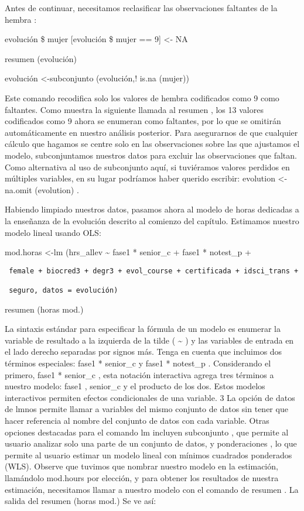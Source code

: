 \documentclass[
]{book}
\begin{document}
Antes de continuar, necesitamos reclasificar las observaciones faltantes de la hembra :

evolución \$ mujer {[}evolución \$ mujer == 9{]} \textless- NA

resumen (evolución)

evolución \textless-subconjunto (evolución,! is.na (mujer))

Este comando recodifica solo los valores de hembra codificados como 9 como faltantes. Como muestra la siguiente llamada al resumen , los 13 valores codificados como 9 ahora se enumeran como faltantes, por lo que se omitirán automáticamente en nuestro análisis posterior. Para asegurarnos de que cualquier cálculo que hagamos se centre solo en las observaciones sobre las que ajustamos el modelo, subconjuntamos nuestros datos para excluir las observaciones que faltan. Como alternativa al uso de subconjunto aquí, si tuviéramos valores perdidos en múltiples variables, en su lugar podríamos haber querido escribir: evolution \textless-na.omit (evolution) .

Habiendo limpiado nuestros datos, pasamos ahora al modelo de horas dedicadas a la enseñanza de la evolución descrito al comienzo del capítulo. Estimamos nuestro modelo lineal usando OLS:

mod.horas \textless-lm (hrs\_allev \textasciitilde{} fase1 * senior\_c + fase1 * notest\_p +

\begin{verbatim}
 female + biocred3 + degr3 + evol_course + certificada + idsci_trans +

 seguro, datos = evolución)
\end{verbatim}

resumen (horas mod.)

La sintaxis estándar para especificar la fórmula de un modelo es enumerar la variable de resultado a la izquierda de la tilde ( \textasciitilde{} ) y las variables de entrada en el lado derecho separadas por signos más. Tenga en cuenta que incluimos dos términos especiales: fase1 * senior\_c y fase1 * notest\_p . Considerando el primero, fase1 * senior\_c , esta notación interactiva agrega tres términos a nuestro modelo: fase1 , senior\_c y el producto de los dos. Estos modelos interactivos permiten efectos condicionales de una variable. 3 La opción de datos de lmnos permite llamar a variables del mismo conjunto de datos sin tener que hacer referencia al nombre del conjunto de datos con cada variable. Otras opciones destacadas para el comando lm incluyen subconjunto , que permite al usuario analizar solo una parte de un conjunto de datos, y ponderaciones , lo que permite al usuario estimar un modelo lineal con mínimos cuadrados ponderados (WLS). Observe que tuvimos que nombrar nuestro modelo en la estimación, llamándolo mod.hours por elección, y para obtener los resultados de nuestra estimación, necesitamos llamar a nuestro modelo con el comando de resumen . La salida del resumen (horas mod.) Se ve así:
\end{document}
